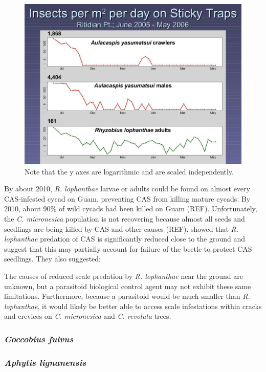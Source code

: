 \documentclass[12pt,letterpaper,english,bibliography=totocnumbered, abstract=on]{scrartcl}
\begin{document}
\begin{figure}[H]
	\centering
	\includegraphics[width=0.7\linewidth]{sticky-traps}
	\caption{Note that the y axes are logarithmic and are scaled independently.}
	\label{fig:sticky-traps}
\end{figure}

By about 2010, \textit{R. lophanthae} larvae or adults could be found on almost every CAS-infested cycad on Guam, preventing CAS from killing mature cycads. By 2010, about 90\% of wild cycads had been killed on Guam (REF). Unfortunately, the \textit{C. micronesica} population is not recovering because almost all seeds and seedlings are being killed by CAS and other causes (REF). \cite{marlerVerticalStratificationPredation2013} showed that \textit{R. lophanthae} predation of CAS is significantly reduced close to the ground and suggest that this may partially account for failure of the beetle to protect CAS seedlings. They also suggested:
\begin{displayquote}
The causes of reduced scale predation by
\textit{R. lophanthae} near the ground are unknown,
but a parasitoid biological control agent may
not exhibit these same limitations. Furthermore, because a parasitoid would be much
smaller than \textit{R. lophanthae}, it would likely be
better able to access scale infestations within
cracks and crevices on \textit{C. micronesica} and
\textit{C. revoluta} trees.
\end{displayquote}

\subsubsection{\textit{Coccobius fulvus}}  

\subsubsection{\textit{Aphytis lignanensis}}
\end{document}
